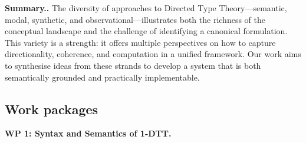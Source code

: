 \documentclass[a4paper,11pt]{article}
\renewcommand{\paragraph}[1]{\textbf{#1.}}
\begin{document}
\paragraph{Summary.}
The diversity of approaches to Directed Type Theory—semantic, modal,
synthetic, and observational—illustrates both the richness of the
conceptual landscape and the challenge of identifying a canonical
formulation. This variety is a strength: it offers multiple
perspectives on how to capture directionality, coherence, and
computation in a unified framework. Our work aims to synthesise ideas
from these strands to develop a system that is both semantically
grounded and practically implementable.

\subsection{Work packages}\label{work-packages}




\paragraph{WP 1: Syntax and Semantics of 1-DTT}
\end{document}
